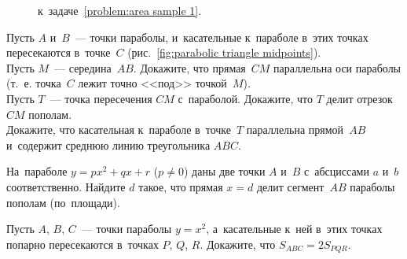 \begin{problems}
\begin{figure}[ht]\begin{center}
        \caption{к~задаче~\ref{problem:area sample 1}.}
        \label{fig:area sample 1}
\end{center}\end{figure}


\item\label{problem:parabolic triangle midpoints}%
Пусть $A$ и~$B$~--- точки параболы, и~касательные к~параболе в~этих точках
пересекаются в~точке~$C$
(рис.~\ref{fig:parabolic triangle midpoints}).
\\
\subproblem
Пусть $M$~--- середина~$AB$.
Докажите, что прямая~$CM$ параллельна оси параболы (т.~е. точка~$C$ лежит точно
<<под>> точкой~$M$).
\\
\subproblem
Пусть $T$~--- точка пересечения $CM$ с~параболой.
Докажите, что $T$ делит отрезок~$CM$ пополам.
\\
\subproblem
Докажите, что касательная к~параболе в~точке~$T$ параллельна прямой~$AB$
и~содержит среднюю линию треугольника $ABC$.

\item
На~параболе $y = p x^2 + q x + r$ ($p \neq 0$) даны две точки $A$ и~$B$
с~абсциссами $a$ и~$b$ соответственно.
Найдите $d$ такое, что прямая $x = d$ делит сегмент~$AB$ параболы пополам
(по~площади).

\item
Пусть $A$, $B$, $C$~--- точки параболы $y = x^2$, а~касательные к~ней
в~этих точках попарно пересекаются в~точках $P$, $Q$, $R$.
Докажите, что $S_{ABC} = 2 S_{PQR}$.


\end{problems}

